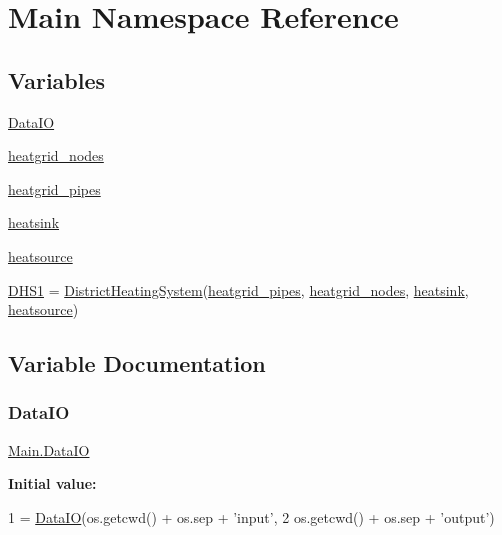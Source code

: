 \hypertarget{namespace_main}{}\section{Main Namespace Reference}
\label{namespace_main}
\subsection*{Variables}
\begin{DoxyCompactItemize}
\item 
\hyperlink{namespace_main_af67e28bb0eb3894f81f4168deb0f836e}{Data\+IO}
\item 
\hyperlink{namespace_main_a00b04001dec555db32f5905617e3b61f}{heatgrid\+\_\+nodes}
\item 
\hyperlink{namespace_main_aae2f2616b49aa0f1f27a99ce2525470f}{heatgrid\+\_\+pipes}
\item 
\hyperlink{namespace_main_a26af29b8548cf87e8d31234213cde312}{heatsink}
\item 
\hyperlink{namespace_main_a1dbfe33a196057c1fc788403424dea4c}{heatsource}
\item 
\hyperlink{namespace_main_ae4535ead940864814690c97070dd4438}{D\+H\+S1} = \hyperlink{class_district_heating_system_1_1_district_heating_system}{District\+Heating\+System}(\hyperlink{namespace_main_aae2f2616b49aa0f1f27a99ce2525470f}{heatgrid\+\_\+pipes}, \hyperlink{namespace_main_a00b04001dec555db32f5905617e3b61f}{heatgrid\+\_\+nodes}, \hyperlink{namespace_main_a26af29b8548cf87e8d31234213cde312}{heatsink}, \hyperlink{namespace_main_a1dbfe33a196057c1fc788403424dea4c}{heatsource})
\end{DoxyCompactItemize}


\subsection{Variable Documentation}
\mbox{\label{namespace_main_af67e28bb0eb3894f81f4168deb0f836e}} 
\subsubsection{\texorpdfstring{Data\+IO}{DataIO}}
{\footnotesize\ttfamily \hyperlink{class_data_i_o_1_1_data_i_o}{Main.\+Data\+IO}}

{\bfseries Initial value\+:}
\begin{DoxyCode}
1 =  \hyperlink{namespace_data_i_o}{DataIO}(os.getcwd() + os.sep + \textcolor{stringliteral}{'input'},
2                     os.getcwd() + os.sep + \textcolor{stringliteral}{'output'})
\end{DoxyCode}



